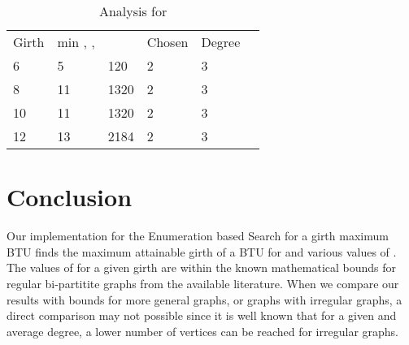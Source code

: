 \documentclass{llncs}
\begin{document}
\begin{table}
\caption{Analysis for  }
\begin{tabular}{llllll}
\hline\noalign{\smallskip}
Girth & min , ,   &  & Chosen  & Degree   \\
\noalign{\smallskip}
\hline
\noalign{\smallskip}
6 & 5 & 120 & 2 & 3 \\
8 & 11 & 1320 & 2 & 3  \\
10 & 11 & 1320 & 2 & 3 \\
12 & 13 & 2184 & 2 & 3 \\
\hline
\end{tabular}
\end{table}

\section{Conclusion}
Our implementation for the Enumeration based Search for a girth maximum  BTU finds the maximum attainable girth of a   BTU for   and various values of .  The values of  for a given girth  are within the known mathematical bounds for regular bi-partitite graphs from the available literature. When we compare our results with bounds for more general graphs, or graphs with irregular graphs, a direct comparison may not possible since it is well known that for a given  and average degree, a lower number of vertices can be reached for irregular graphs.  
\end{document}
